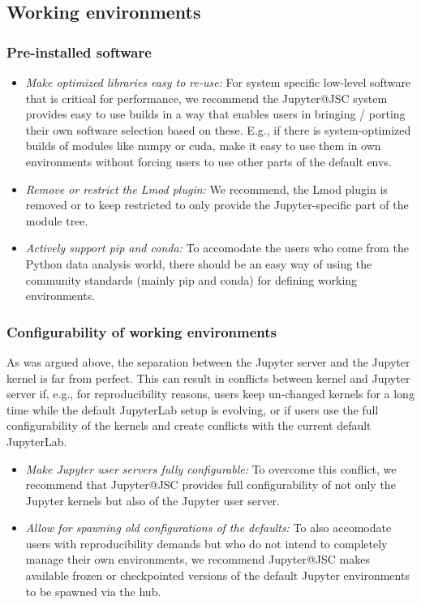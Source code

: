 \subsection{Working environments}

\subsubsection{Pre-installed software}

\begin{itemize}
  \item \emph{Make optimized libraries easy to re-use:} For system specific low-level software that is critical for performance, we recommend the Jupyter@JSC system provides easy to use builds in a way that enables users in bringing / porting their own software selection based on these. E.g., if there is system-optimized builds of modules like numpy or cuda, make it easy to use them in own environments without forcing users to use other parts of the default envs.
  \item \emph{Remove or restrict the Lmod plugin:} We recommend, the Lmod plugin is removed or to keep restricted to only provide the Jupyter-specific part of the module tree.
  \item \emph{Actively support pip and conda:} To accomodate the users who come from the Python data analysis world, there should be an easy way of using the community standards (mainly pip and conda) for defining working environments.
\end{itemize}

\subsubsection{Configurability of working environments}

As was argued above, the separation between the Jupyter server and the Jupyter kernel is far from perfect.
This can result in conflicts between kernel and Jupyter server if, e.g., for reproducibility reasons, users keep un-changed kernels for a long time while the default JupyterLab setup is evolving, or if users use the full configurability of the kernels and create conflicts with the current default JupyterLab.

\begin{itemize}
  \item \emph{Make Jupyter user servers fully configurable:} To overcome this conflict, we recommend that Jupyter@JSC provides full configurability of not only the Jupyter kernels but also of the Jupyter user server.
  \item \emph{Allow for spawning old configurations of the defaults:} To also accomodate users with reproducibility demands but who do not intend to completely manage their own environments, we recommend Jupyter@JSC makes available frozen or checkpointed versions of the default Jupyter environments to be spawned via the hub.
\end{itemize}


